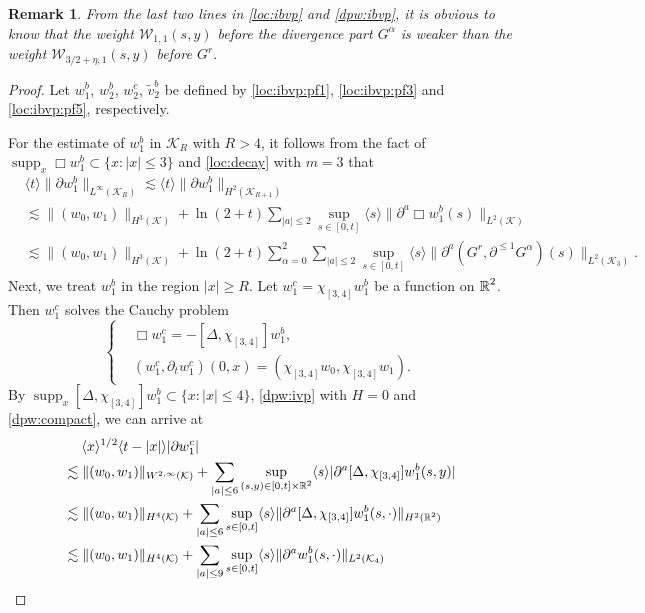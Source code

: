 \documentclass[11pt,twoside]{article}
\def\cK{\mathcal K}
\def\cW{\mathcal W}
\def\R{\mathop{\mathbb R\kern 0pt}\nolimits}
\def\supp{\mathop{\rm supp}\nolimits}
\def\p{\partial}
\def\supp{\operatorname{supp}}
\def\ls{\lesssim}
\newcommand{\w}[1]{\langle {#1} \rangle}
\theoremstyle{plain}
\newtheorem{remark}{Remark}[section]
\theoremstyle{definition}
\numberwithin{equation}{section}
\begin{document}
\begin{remark}
From the last two lines in \eqref{loc:ibvp} and \eqref{dpw:ibvp}, it is obvious to know that the weight
$\cW_{1,1}(s,y)$ before the divergence part $G^\alpha$ is weaker than the weight $\cW_{3/2+\eta,1}(s,y)$ before $G^r$.
\end{remark}
\begin{proof}
Let $w_1^b$, $w_2^b$, $w_2^c$, $\tilde v_2^b$ be defined by \eqref{loc:ibvp:pf1}, \eqref{loc:ibvp:pf3} and \eqref{loc:ibvp:pf5}, respectively.

For the estimate of $w_1^b$ in $\cK_R$ with $R>4$, it follows from the fact of $\supp_x\Box w_1^b\subset\{x:|x|\le3\}$
and \eqref{loc:decay} with $m=3$ that
\begin{equation}\label{dpw:pf1}
\begin{split}
&\w{t}\|\p w_1^b\|_{L^\infty(\cK_R)}\ls\w{t}\|\p w_1^b\|_{H^2(\cK_{R+1})}\\
&\ls\|(w_0,w_1)\|_{H^3(\cK)}+\ln(2+t)\sum_{|a|\le2}\sup_{s\in[0,t]}\w{s}\|\p^a\Box w_1^b(s)\|_{L^2(\cK)}\\
&\ls\|(w_0,w_1)\|_{H^3(\cK)}+\ln(2+t)\sum_{\alpha=0}^2\sum_{|a|\le2}\sup_{s\in[0,t]}\w{s}\|\p^a(G^r,\p^{\le1}G^\alpha)(s)\|_{L^2(\cK_3)}.
\end{split}
\end{equation}
Next, we treat $w_1^b$ in the region $|x|\ge R$.
Let $w_1^c=\chi_{[3,4]}w_1^b$ be a function on $\R^2$.
Then $w_1^c$ solves the Cauchy problem
\begin{equation*}
\left\{
\begin{aligned}
&\Box w_1^c=-[\Delta,\chi_{[3,4]}]w_1^b,\\
&(w_1^c,\p_tw_1^c)(0,x)=(\chi_{[3,4]}w_0,\chi_{[3,4]}w_1).
\end{aligned}
\right.
\end{equation*}
By $\supp_x[\Delta,\chi_{[3,4]}]w_1^b\subset\{x:|x|\le4\}$, \eqref{dpw:ivp} with $H=0$ and \eqref{dpw:compact},
we can arrive at
\begin{equation}\label{dpw:pf2}
\begin{split}
&\quad\; \w{x}^{1/2}\w{t-|x|}|\p w_1^c|\\
&\ls\|(w_0,w_1)\|_{W^{2,\infty}(\cK)}+\sum_{|a|\le6}\sup_{(s,y)\in[0,t]\times\R^2}\w{s}|\p^a[\Delta,\chi_{[3,4]}]w_1^b(s,y)|\\
&\ls\|(w_0,w_1)\|_{H^4(\cK)}+\sum_{|a|\le6}\sup_{s\in[0,t]}\w{s}\|\p^a[\Delta,\chi_{[3,4]}]w_1^b(s,\cdot)\|_{H^2(\R^2)}\\
&\ls\|(w_0,w_1)\|_{H^4(\cK)}+\sum_{|a|\le9}\sup_{s\in[0,t]}\w{s}\|\p^aw_1^b(s,\cdot)\|_{L^2(\cK_4)}\\

\end{split}
\end{equation}
\end{proof}
\end{document}
